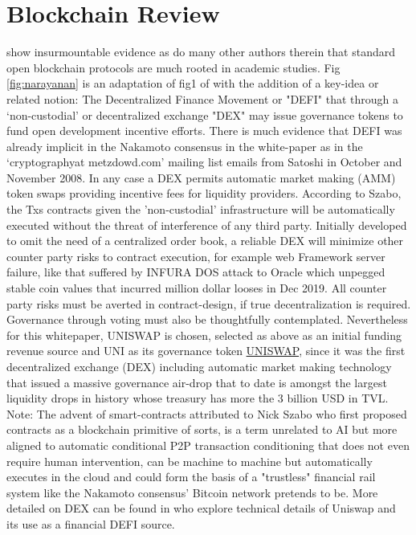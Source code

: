 \documentclass[final,5p,times,twocolumn,authoryear]{elsarticle}
\begin{document}
\section{Blockchain Review}
\label{sec:bc_review}
\cite{arvindandclark2017} show insurmountable evidence as do many other authors therein that standard open blockchain protocols are much rooted in academic studies. Fig \ref{fig:narayanan} is an adaptation of fig1 of \citet{arvindandclark2017} with the addition of a key-idea or related notion: The Decentralized Finance Movement or "DEFI" that through a `non-custodial' or decentralized exchange "DEX" may issue governance tokens to fund open development incentive efforts. There is much evidence that DEFI was already implicit in the Nakamoto consensus in the white-paper as in the `cryptographyat metzdowd.com' mailing list emails from Satoshi in October and November 2008. In any case a DEX permits automatic market making (AMM) token swaps providing incentive fees for liquidity providers. According to Szabo, the Txs contracts given the 'non-custodial' infrastructure will be automatically executed without the threat of interference of any third party. Initially developed to omit the need of a centralized order book, a reliable DEX will minimize other counter party risks to contract execution, for example web Framework server failure, like that suffered by INFURA DOS attack to Oracle which unpegged  stable coin values that incurred million dollar looses in Dec 2019. All counter party risks must be averted in contract-design, if true decentralization is required. Governance through voting must also be thoughtfully contemplated. Nevertheless for this whitepaper, UNISWAP is chosen, selected as above as an initial funding revenue source and UNI as its governance token \href{https://github.com/Uniswap}{UNISWAP}, since it was the first decentralized exchange (DEX) including automatic market making technology that issued a massive governance air-drop that to date is amongst the largest liquidity drops in history whose treasury has more the 3 billion USD in TVL. Note: The advent of smart-contracts attributed to Nick Szabo who first proposed contracts as a blockchain primitive of sorts, is a term unrelated to AI but more aligned to automatic conditional P2P transaction conditioning that does not even require human intervention, can be machine to machine but automatically executes in the cloud and could form the basis of a "trustless" financial rail system like the Nakamoto consensus' Bitcoin network pretends to be. More detailed on DEX can be found in \cite{uniswap2019_angeris} who explore technical details of Uniswap and its use as a financial DEFI source.
\end{document}
